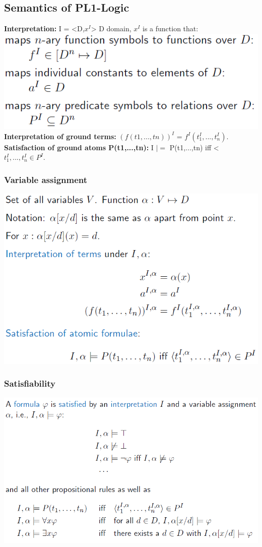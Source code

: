 \documentclass{article}
\begin{document}
\subsection{Semantics of PL1-Logic}
\textbf{Interpretation: }I = <D,$x^I$> D domain, $x^I$ is a function that:\\
\includegraphics[scale=0.6]{43.png}\\
\textbf{Interpretation of ground terms: }$(f(t1,..., tn))^I$ = $f^I(t^I_1,...,t^I_n).$\\
\textbf{Satisfaction of ground atoms P(t1,...,tn): }I $|=$ P(t1,...,tn) iff <$t^I_1,..., t^I_n \in P^I$.
\subsubsection{Variable assignment}
\includegraphics[scale=0.6]{44.png}
\subsubsection{Satisfiability}
\includegraphics[scale=0.6]{45.png}
\end{document}
